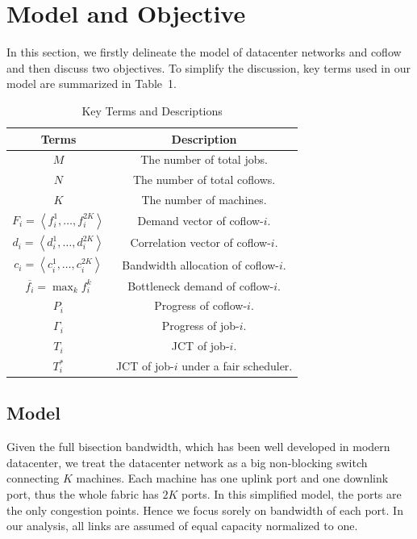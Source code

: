 \documentclass[10pt, conference, letterpaper]{IEEEtran}
\begin{document}
\section{Model and Objective}\label{model}
In this section, we firstly delineate the model of datacenter networks and coflow and then discuss two objectives. To simplify the discussion, key terms used in our model are summarized in Table~1.
\begin{table}
\caption{Key Terms and Descriptions}
\begin{center}
\begin{tabular}{|c|c|}
\hline
Terms & Description\\
\hline
$M$ & The number of total jobs.\\
\hline
$N$ & The number of total coflows.\\
\hline
$K$ & The number of machines.\\
\hline
$F_i = \left\langle f_i^1,\dots,f_i^{2K}\right\rangle$ & Demand vector of coflow-$i$.\\
\hline
$d_i = \left\langle d_i^1,\dots,d_i^{2K}\right\rangle$ & Correlation vector of coflow-$i$.\\
\hline
$c_i=\left\langle c_i^1,\dots,c_i^{2K}\right\rangle$ & Bandwidth allocation of coflow-$i$.\\
\hline
$\overline{f_i}=\max_{k} f_i^k$ & Bottleneck demand of coflow-$i$.\\
\hline
$P_i$ & Progress of coflow-$i$.\\
\hline
$\Gamma_i$ & Progress of job-$i$.\\
\hline
$T_i$ & JCT of job-$i$.\\
\hline
$T_i^*$ & JCT of job-$i$ under a fair scheduler.\\
\hline
\end{tabular}
\end{center}
\end{table}

\subsection{Model}
Given the full bisection bandwidth, which has been well developed in modern datacenter\cite{jupiter}, we treat the datacenter network as a big non-blocking switch connecting $K$ machines. Each machine has one uplink port and one downlink port, thus the whole fabric has $2K$ ports. In this simplified model, the ports are the only congestion points. Hence we focus sorely on bandwidth of each port. In our analysis, all links are assumed of equal capacity normalized to one.
\end{document}
